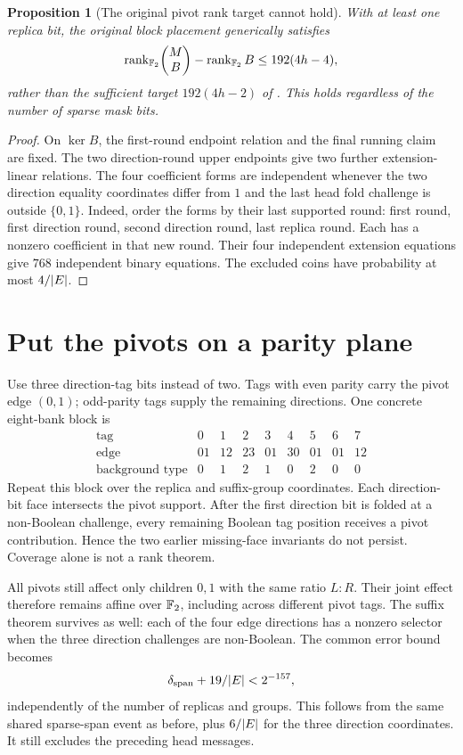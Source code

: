 \documentclass[11pt]{article}
\newtheorem{proposition}{Proposition}
\begin{document}
\begin{proposition}[The original pivot rank target cannot hold]
With at least one replica bit, the original block placement generically satisfies
\[
 \operatorname{rank}_{\mathbb{F}_2}\!\begin{pmatrix}M\\B\end{pmatrix}
 -\operatorname{rank}_{\mathbb{F}_2}B
 \le192(4h-4),
\]
rather than the sufficient target $192(4h-2)$ of . This holds regardless of the number of sparse mask bits.
\end{proposition}
\begin{proof}
On $\ker B$, the first-round endpoint relation and the final running claim are fixed. The two direction-round upper endpoints give two further extension-linear relations. The four coefficient forms are independent whenever the two direction equality coordinates differ from $1$ and the last head fold challenge is outside $\{0,1\}$. Indeed, order the forms by their last supported round: first round, first direction round, second direction round, last replica round. Each has a nonzero coefficient in that new round. Their four independent extension equations give $768$ independent binary equations. The excluded coins have probability at most $4/|E|$.
\end{proof}

\section{Put the pivots on a parity plane}

Use three direction-tag bits instead of two. Tags with even parity carry the pivot edge $(0,1)$; odd-parity tags supply the remaining directions. One concrete eight-bank block is
\[
\begin{array}{c|rrrrrrrr}
\text{tag}&0&1&2&3&4&5&6&7\\
\hline
\text{edge}&01&12&23&01&30&01&01&12\\
\text{background type}&0&1&2&1&0&2&0&0
\end{array}
\]
Repeat this block over the replica and suffix-group coordinates. Each direction-bit face intersects the pivot support. After the first direction bit is folded at a non-Boolean challenge, every remaining Boolean tag position receives a pivot contribution. Hence the two earlier missing-face invariants do not persist. Coverage alone is not a rank theorem.

All pivots still affect only children $0,1$ with the same ratio $L:R$. Their joint effect therefore remains affine over $\mathbb{F}_2$, including across different pivot tags. The suffix theorem survives as well: each of the four edge directions has a nonzero selector when the three direction challenges are non-Boolean. The common error bound becomes
\[
 \delta_{\mathrm{span}}+19/|E|<2^{-157},
\]
independently of the number of replicas and groups. This follows from the same shared sparse-span event as before, plus $6/|E|$ for the three direction coordinates. It still excludes the preceding head messages.
\end{document}
